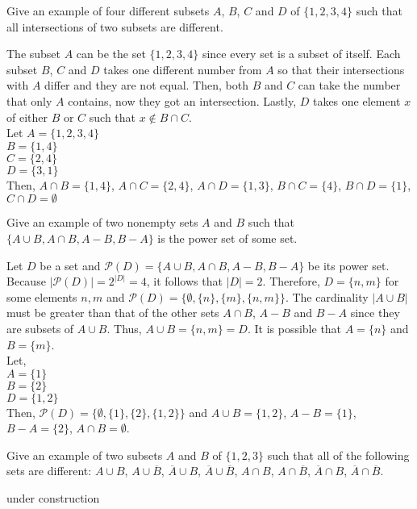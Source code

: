 \documentclass[12pt]{article}
\newenvironment{problem}[2][Problem]{\begin{trivlist}
		\item[\hskip \labelsep {\bfseries #1}\hskip \labelsep {\bfseries #2.}]}{\end{trivlist}}
\newenvironment{solution}[2][Solution]{\begin{trivlist}
		\item[\hskip \labelsep {\bfseries #1}\hskip \labelsep {\bfseries #2.}]}{\end{trivlist}}
\begin{document}
\begin{problem}{32}
	Give an example of four different subsets $A$, $B$, $C$ and $D$ of $\{1,2,3,4\}$ such that all intersections of two subsets are different.
	\begin{solution}{}
		The subset $A$ can be the set $\{1,2,3,4\}$ since every set is a subset of itself. Each subset $B$, $C$ and $D$  takes one different number from $A$ so that their intersections with $A$ differ and they are not equal. Then, both $B$ and $C$ can take the number that only $A$ contains, now they got an intersection. Lastly, $D$ takes one element $x$ of either $B$ or $C$ such that $x\notin B\cap C$.\\ Let
		$A=\{1,2,3,4\}$\\
		$B=\{1,4\}$\\
		$C=\{2,4\}$\\
		$D=\{3,1\}$\\
		Then, $A\cap B= \{1,4\}$, $A\cap C= \{2,4\}$, $A\cap D=\{1,3\}$, $B\cap C=\{4\}$, $B\cap D= \{1\}$, $C\cap D= \emptyset$
	\end{solution}
\end{problem}
\begin{problem}{33}
	Give an example of two nonempty sets $A$ and $B$ such that $\{A\cup B, A\cap B, A-B, B-A\}$ is the power set of some set.
	\begin{solution}{}
		Let $D$ be a set and $\mathcal{P}(D)=\{A\cup B, A\cap B, A-B, B-A\}$ be its power set. Because  $|\mathcal{P}(D)|=2^{|D|}=4$, it follows that $|D|=2$. Therefore, $D=\{n,m\}$ for some elements $n,m$ and  $\mathcal{P}(D)=\{\emptyset, \{n\}, \{m\}, \{n,m\}\}$.
		The cardinality $|A\cup B|$ must be greater than that of the other sets $A\cap B$, $A-B$ and $B-A$ since they are subsets of $A\cup B$. Thus, $A\cup B= \{n,m\} = D$. It is possible that $A=\{n\}$ and $B=\{m\}$.\\
		Let,\\
		$A=\{1\}$\\
		$B=\{2\}$\\
		$D=\{1,2\}$\\
		Then, $\mathcal{P}(D)=\{\emptyset, \{1\},\{2\},\{1,2\}\}$ and $A\cup B = \{1,2\}$, $A-B=\{1\}$, $B-A=\{2\}$, $A\cap B= \emptyset$.
	\end{solution}
\end{problem}
\begin{problem}{34}
	Give an example of two subsets $A$ and $B$ of $\{1,2,3\}$ such that all of the following sets are different: $A\cup B$, $A\cup \overline{B}$, $\overline{A}\cup B$, $\overline{A}\cup \overline{B}$, $A\cap B$, $A\cap \overline{B}$, $\overline{A}\cap B$, $\overline{A}\cap \overline{B}$.
	\begin{solution}{}
	under construction
	\end{solution}
\end{problem}
\end{document}
